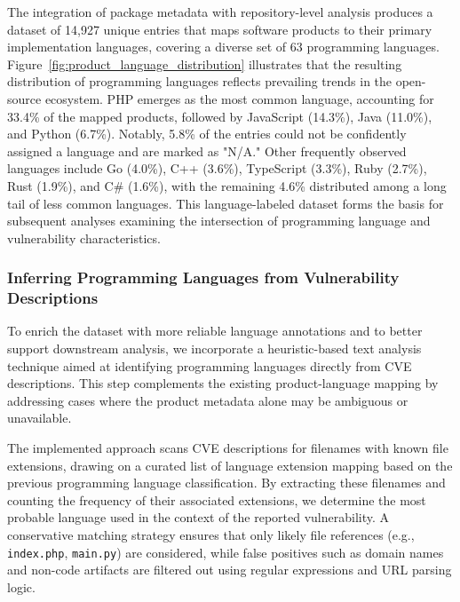 The integration of package metadata with repository-level analysis produces a dataset of 14,927 unique entries that maps software products to their primary implementation languages, covering a diverse set of 63 programming languages. Figure~\ref{fig:product_language_distribution} illustrates that the resulting distribution of programming languages reflects prevailing trends in the open-source ecosystem. PHP emerges as the most common language, accounting for 33.4\% of the mapped products, followed by JavaScript (14.3\%), Java (11.0\%), and Python (6.7\%). Notably, 5.8\% of the entries could not be confidently assigned a language and are marked as "N/A." Other frequently observed languages include Go (4.0\%), C++ (3.6\%), TypeScript (3.3\%), Ruby (2.7\%), Rust (1.9\%), and C\# (1.6\%), with the remaining 4.6\% distributed among a long tail of less common languages. This language-labeled dataset forms the basis for subsequent analyses examining the intersection of programming language and vulnerability characteristics.

\subsubsection{Inferring Programming Languages from Vulnerability Descriptions}
To enrich the dataset with more reliable language annotations and to better support downstream analysis, we incorporate a heuristic-based text analysis technique aimed at identifying programming languages directly from CVE descriptions. This step complements the existing product-language mapping by addressing cases where the product metadata alone may be ambiguous or unavailable.

The implemented approach scans CVE descriptions for filenames with known file extensions, drawing on a curated list of language extension mapping based on the previous programming language classification. By extracting these filenames and counting the frequency of their associated extensions, we determine the most probable language used in the context of the reported vulnerability. A conservative matching strategy ensures that only likely file references (e.g., \texttt{index.php}, \texttt{main.py}) are considered, while false positives such as domain names and non-code artifacts are filtered out using regular expressions and URL parsing logic.

